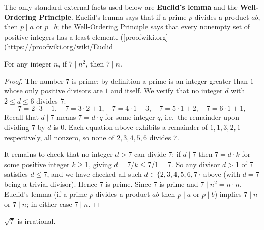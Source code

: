 The only standard external facts used below are \textbf{Euclid's lemma} and the \textbf{Well-Ordering Principle}. Euclid's lemma says that if a prime $p$ divides a product $ab$, then $p\mid a$ or $p\mid b$; the Well-Ordering Principle says that every nonempty set of positive integers has a least element. ([proofwiki.org](https://proofwiki.org/wiki/Euclid%

\begin{lemma}
For any integer $n$, if $7\mid n^2$, then $7\mid n$.
\end{lemma}

\begin{proof}
The number $7$ is prime: by definition a prime is an integer greater than $1$ whose only positive divisors are $1$ and itself. We verify that no integer $d$ with $2 \le d \le 6$ divides $7$:
\[
7 = 2\cdot3+1,\quad 7=3\cdot2+1,\quad 7=4\cdot1+3,\quad 7=5\cdot1+2,\quad 7=6\cdot1+1,
\]
Recall that $d \mid 7$ means $7 = d\cdot q$ for some integer $q$, i.e.\ the remainder upon dividing $7$ by $d$ is $0$. Each equation above exhibits a remainder of $1, 1, 3, 2, 1$ respectively, all nonzero, so none of $2,3,4,5,6$ divides $7$.

It remains to check that no integer $d > 7$ can divide $7$: if $d \mid 7$ then $7 = d\cdot k$ for some positive integer $k \ge 1$, giving $d = 7/k \le 7/1 = 7$. So any divisor $d > 1$ of $7$ satisfies $d \le 7$, and we have checked all such $d \in \{2,3,4,5,6,7\}$ above (with $d=7$ being a trivial divisor). Hence $7$ is prime.
Since $7$ is prime and $7\mid n^2 = n\cdot n$, Euclid's lemma (if a prime $p$ divides a product $ab$ then $p\mid a$ or $p\mid b$) implies $7\mid n$ or $7\mid n$; in either case $7\mid n$.
\end{proof}

\begin{theorem}
$\sqrt{7}$ is irrational.
\end{theorem}

